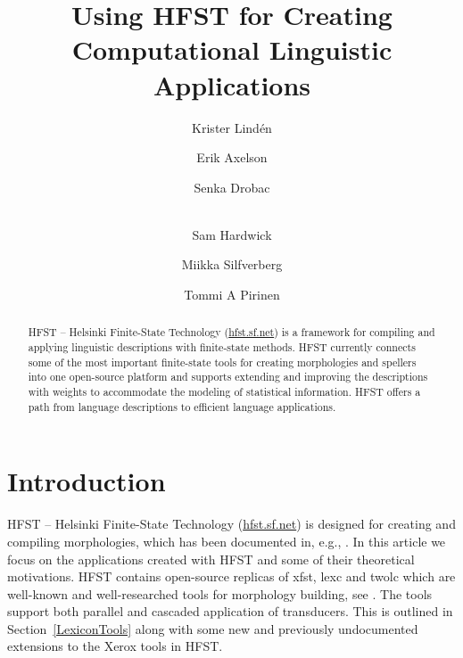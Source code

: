 \documentclass{llncs}
\begin{document}
%
\title{Using HFST for Creating Computational Linguistic Applications}
%
\author{Krister Lind\'{e}n \and Erik Axelson \and Senka Drobac \and\\
  Sam Hardwick \and Miikka Silfverberg \and Tommi A Pirinen }


\maketitle

\begin{abstract}
  \sloppy HFST – Helsinki Finite-State Technology (\url{hfst.sf.net})
  is a framework for compiling and applying linguistic descriptions
  with finite-state methods. HFST currently connects some of the most 
  important finite-state tools for creating morphologies and spellers into 
  one open-source platform and supports extending and improving 
  the descriptions with weights to accommodate the modeling of 
  statistical information. HFST offers a path from language descriptions 
  to efficient language applications.

\end{abstract}

\section{Introduction}

HFST – Helsinki Finite-State Technology (\url{hfst.sf.net}) is designed 
for creating and compiling morphologies, which has been documented in, e.g.,  
\cite{linden/2009/sfcm,linden/2011/sfcm}. In this article we focus on the applications 
created with HFST and some of their theoretical motivations. HFST
contains open-source replicas of xfst, lexc and twolc which are
well-known and well-researched tools for morphology building, see \cite{beesley/2003}. The tools
support both parallel and cascaded application of transducers. 
This is outlined in Section~\ref{LexiconTools} along with some new and 
previously undocumented extensions to the Xerox tools in HFST.  
\end{document}

